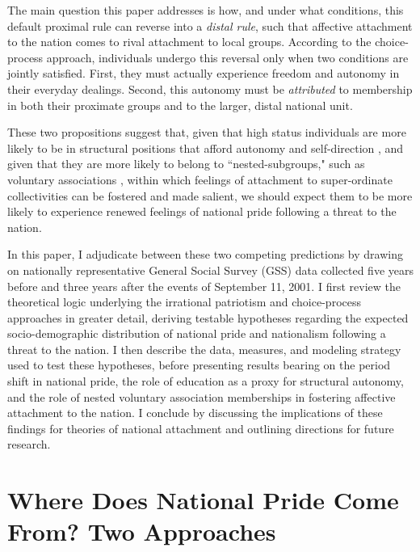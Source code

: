\documentclass[12pt,letterpaper]{article}
\begin{document}
The main question this paper addresses is how, and under what conditions, this default proximal rule can reverse into a \textit{distal rule}, such that affective attachment to the nation comes to rival attachment to local groups. According to the choice-process approach, individuals undergo this reversal only when two conditions are jointly satisfied. First, they must actually experience freedom and autonomy in their everyday dealings. Second, this autonomy must be \textit{attributed} to membership in both their proximate groups and to the larger, distal national unit. 

These two propositions suggest that, given that high status individuals are more likely to be in structural positions that afford autonomy and self-direction \citep{kohn1969class, kohn1977class-ee1, kohn1978reciprocal-f1b}, and given that they are more likely to belong to ``nested-subgroups," such as voluntary associations \citep{bell1956social, freeman1957correlates, janoski1996pathways, knoke1986associations, mcpherson1981dynamic, scott1957membership, tomeh1973formal, dederichs2024join-411}, within which feelings of attachment to super-ordinate collectivities can be fostered and made salient, we should expect them to be more likely to experience renewed feelings of national pride following a threat to the nation.

In this paper, I adjudicate between these two competing predictions by drawing on nationally representative General Social Survey (GSS) data collected five years before and three years after the events of September 11, 2001. I first review the theoretical logic underlying the irrational patriotism and choice-process approaches in greater detail, deriving testable hypotheses regarding the expected socio-demographic distribution of national pride and nationalism following a threat to the nation. I then describe the data, measures, and modeling strategy used to test these hypotheses, before presenting results bearing on the period shift in national pride, the role of education as a proxy for structural autonomy, and the role of nested voluntary association memberships in fostering affective attachment to the nation. I conclude by discussing the implications of these findings for theories of national attachment and outlining directions for future research.

\section{Where Does National Pride Come From? Two Approaches}
\end{document}

